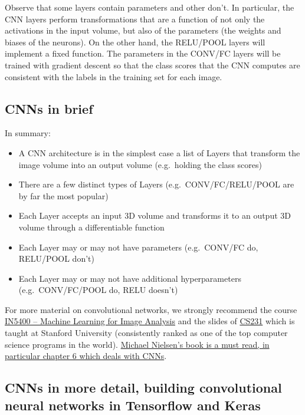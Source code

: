 \documentclass[%
oneside,                 %
final,                   %
10pt]{article}
\begin{document}
Observe that some layers contain
parameters and other don’t. In particular, the CNN layers perform
transformations that are a function of not only the activations in the
input volume, but also of the parameters (the weights and biases of
the neurons). On the other hand, the RELU/POOL layers will implement a
fixed function. The parameters in the CONV/FC layers will be trained
with gradient descent so that the class scores that the CNN computes
are consistent with the labels in the training set for each image.


\subsection{CNNs in brief}

In summary:

\begin{itemize}
\item A CNN architecture is in the simplest case a list of Layers that transform the image volume into an output volume (e.g.~holding the class scores)

\item There are a few distinct types of Layers (e.g.~CONV/FC/RELU/POOL are by far the most popular)

\item Each Layer accepts an input 3D volume and transforms it to an output 3D volume through a differentiable function

\item Each Layer may or may not have parameters (e.g.~CONV/FC do, RELU/POOL don’t)

\item Each Layer may or may not have additional hyperparameters (e.g.~CONV/FC/POOL do, RELU doesn’t)
\end{itemize}

\noindent
For more material on convolutional networks, we strongly recommend
the course
\href{{https://www.uio.no/studier/emner/matnat/ifi/IN5400/index-eng.html}}{IN5400 – Machine Learning for Image Analysis}
and the slides of \href{{http://cs231n.github.io/convolutional-networks/}}{CS231} which is taught at Stanford University (consistently ranked as one of the top computer science programs in the world). \href{{http://neuralnetworksanddeeplearning.com/chap6.html}}{Michael Nielsen's book is a must read, in particular chapter 6 which deals with CNNs}.


\subsection{CNNs in more detail, building convolutional neural networks in Tensorflow and Keras}
\end{document}
